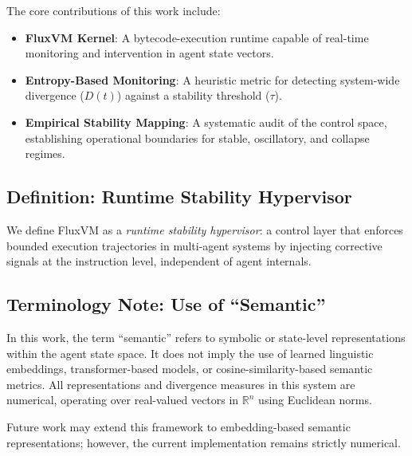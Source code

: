 \documentclass{article}
\begin{document}
The core contributions of this work include:
\begin{itemize}
    \item \textbf{FluxVM Kernel}: A bytecode-execution runtime capable of real-time monitoring and intervention in agent state vectors.
    \item \textbf{Entropy-Based Monitoring}: A heuristic metric for detecting system-wide divergence ($D(t)$) against a stability threshold ($\tau$).
    \item \textbf{Empirical Stability Mapping}: A systematic audit of the control space, establishing operational boundaries for stable, oscillatory, and collapse regimes.
\end{itemize}

\subsection*{Definition: Runtime Stability Hypervisor}
We define FluxVM as a \textit{runtime stability hypervisor}: a control layer that enforces bounded execution trajectories in multi-agent systems by injecting corrective signals at the instruction level, independent of agent internals.

\subsection*{Terminology Note: Use of ``Semantic''}
In this work, the term ``semantic'' refers to symbolic or state-level representations
within the agent state space. It does not imply the use of learned linguistic
embeddings, transformer-based models, or cosine-similarity-based semantic metrics.
All representations and divergence measures in this system are numerical, operating
over real-valued vectors in $\mathbb{R}^n$ using Euclidean norms.

Future work may extend this framework to embedding-based semantic representations;
however, the current implementation remains strictly numerical.
\end{document}
